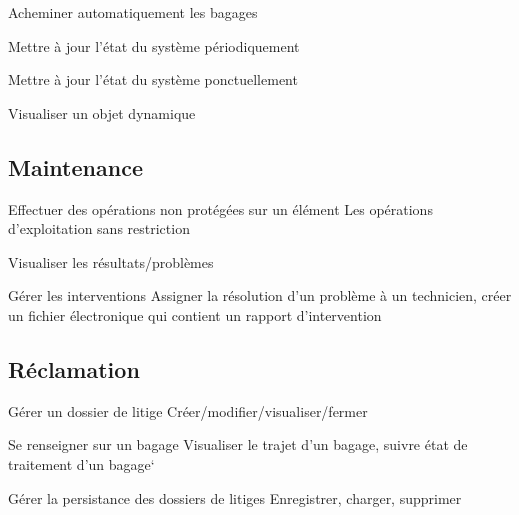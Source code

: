 \nBesoin
{Acheminer automatiquement les bagages}
{}{}

\nBesoin
{Mettre à jour l'état du système périodiquement}
{}{}

\nBesoin
{Mettre à jour l'état du système ponctuellement}
{}{}

\nBesoin
{Visualiser un objet dynamique}
{}
{}

\subsection{Maintenance}
\setcounter{cntBesoins}{1}

\nBesoin
{Effectuer des opérations non protégées sur un élément}
{}
{Les opérations d'exploitation sans restriction}

\nBesoin
{Visualiser les résultats/problèmes}
{}{}

\nBesoin
{Gérer les interventions}
{}
{Assigner la résolution d'un problème à un technicien, créer un fichier électronique qui contient un rapport d'intervention}

\subsection{Réclamation}
\setcounter{cntBesoins}{1}

\nBesoin
{Gérer un dossier de  litige}
{}
{Créer/modifier/visualiser/fermer}

\nBesoin
{Se renseigner sur un bagage}
{}
{Visualiser le trajet d'un bagage,  suivre état de traitement d'un bagage}`

\nBesoin
{Gérer la persistance des dossiers de litiges}
{}
{Enregistrer, charger, supprimer}

